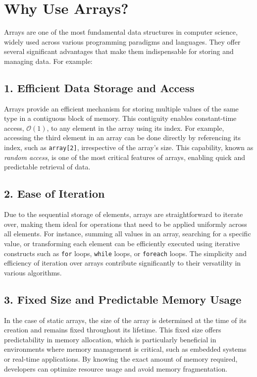 \documentclass[12pt, oneside]{book}
\begin{document}
\printbibliography
\section{Why Use Arrays?}

Arrays are one of the most fundamental data structures in computer science, widely used across various programming paradigms and languages. They offer several significant advantages that make them indispensable for storing and managing data.  For example:

\subsection{1. Efficient Data Storage and Access}

Arrays provide an efficient mechanism for storing multiple values of the same type in a contiguous block of memory. This contiguity enables constant-time access, $\mathcal{O}(1)$, to any element in the array using its index. For example, accessing the third element in an array can be done directly by referencing its index, such as \texttt{array[2]}, irrespective of the array's size. This capability, known as \textit{random access}, is one of the most critical features of arrays, enabling quick and predictable retrieval of data.

\subsection{2. Ease of Iteration}

Due to the sequential storage of elements, arrays are straightforward to iterate over, making them ideal for operations that need to be applied uniformly across all elements. For instance, summing all values in an array, searching for a specific value, or transforming each element can be efficiently executed using iterative constructs such as \texttt{for} loops, \texttt{while} loops, or \texttt{foreach} loops. The simplicity and efficiency of iteration over arrays contribute significantly to their versatility in various algorithms.

\subsection{3. Fixed Size and Predictable Memory Usage}

In the case of static arrays, the size of the array is determined at the time of its creation and remains fixed throughout its lifetime. This fixed size offers predictability in memory allocation, which is particularly beneficial in environments where memory management is critical, such as embedded systems or real-time applications. By knowing the exact amount of memory required, developers can optimize resource usage and avoid memory fragmentation.
\end{document}
